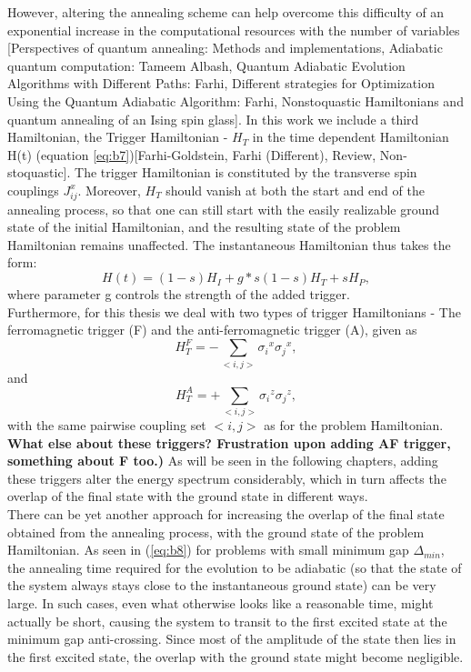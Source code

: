 \documentclass[12]{article}
\begin{document}
However, altering the annealing scheme can help overcome this difficulty of an exponential increase in the computational resources with the number of variables [Perspectives of quantum annealing: Methods and implementations, Adiabatic quantum computation: Tameem Albash, Quantum Adiabatic Evolution Algorithms with Different Paths: Farhi, Different strategies for Optimization Using the Quantum Adiabatic Algorithm: Farhi, Nonstoquastic Hamiltonians and quantum annealing of an Ising spin glass]. In this work we include a third Hamiltonian, the Trigger Hamiltonian - $H_T$ in the time dependent Hamiltonian H(t) (equation \ref{eq:b7})[Farhi-Goldstein, Farhi (Different), Review, Non-stoquastic]. The trigger Hamiltonian is constituted by the transverse spin couplings $J_{ij}^x$. Moreover, $H_T$ should vanish at both the start and end of the annealing process, so that one can still start with the easily realizable ground state of the initial Hamiltonian, and the resulting state of the problem Hamiltonian remains unaffected. The instantaneous Hamiltonian thus takes the form: 
\begin{equation}
H(t)= (1-s)H_I + g*s(1-s)H_T + sH_P ,\label{eq:b12}
\end{equation} 
where parameter g controls the strength of the added trigger.\\
Furthermore, for this thesis we deal with two types of trigger Hamiltonians - The ferromagnetic trigger (F) and the anti-ferromagnetic trigger (A), given as
\begin{equation}
H_T^F = - \sum\limits_{<i,j>}{\sigma_i}^x{\sigma_j}^x,    \label{eq:b13}
\end{equation}
and
\begin{equation}
H_T^A= +\sum\limits_{<i,j>}{\sigma_i}^z{\sigma_j}^z,          \label{eq:b14}
\end{equation}
with the same pairwise coupling set $<i,j>$ as for the problem Hamiltonian.
\textbf{What else about these triggers? Frustration upon adding AF trigger, something about F too.)}
As will be seen in the following chapters, adding these triggers alter the energy spectrum considerably, which in turn affects the overlap of the final state with the ground state in different ways. \\


There can be yet another approach for increasing the overlap of the final state obtained from the annealing process, with the ground state of the problem Hamiltonian. As seen in (\ref{eq:b8}) for problems with small minimum gap $\Delta_{min}$, the annealing time required for the evolution to be adiabatic (so that the state of the system always stays close to the instantaneous ground state) can be very large. In such cases, even what otherwise looks like a reasonable time, might actually be short, causing the system to transit to the first excited state at the minimum gap anti-crossing. Since most of the amplitude of the state then lies in the first excited state, the overlap with the ground state might become negligible. 
\end{document}
